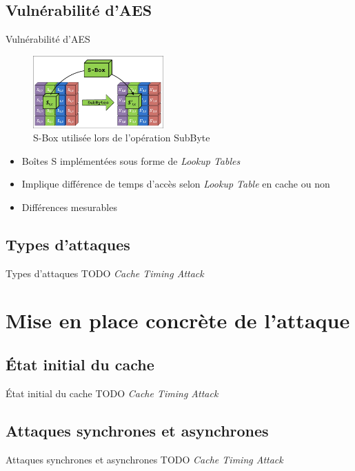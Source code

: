 \documentclass[11pt]{beamer}
\begin{document}
\subsection{Vulnérabilité d'AES}
\begin{frame}{Vulnérabilité d'AES}
\begin{figure}[h]
  		\centering
  		\includegraphics[width=5cm]{figures/s_box.jpg}
  		\caption{S-Box utilisée lors de l'opération SubByte}
  		\label{sbox} 
	\end{figure}
	\begin{itemize}
		\item Boîtes S implémentées sous forme de \emph{Lookup Tables}
		\item Implique différence de temps d'accès selon \emph{Lookup Table} en cache ou non
		\item Différences mesurables
	\end{itemize}
\end{frame}

\subsection{Types d'attaques}
\begin{frame}{Types d'attaques}
TODO \emph{Cache Timing Attack} 
\end{frame}

\section{Mise en place concrète de l'attaque}

\subsection{État initial du cache} 
\begin{frame}{État initial du cache}
TODO \emph{Cache Timing Attack} 
\end{frame}

\subsection{Attaques synchrones et asynchrones}
\begin{frame}{Attaques synchrones et asynchrones}
TODO \emph{Cache Timing Attack} 
\end{frame}
\end{document}
